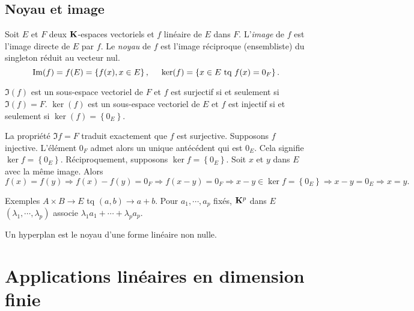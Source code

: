 \subsection{Noyau et image}
 
\begin{defi}
  Soit $E$ et $F$ deux $\K$-espaces vectoriels et $f$ linéaire de $E$ dans $F$. L'\emph{image} de $f$ est l'image directe de $E$ par $f$. Le \emph{noyau} de $f$ est l'image réciproque (ensembliste) du singleton réduit au vecteur nul.
\begin{displaymath}
  \Im(f) = f(E) = \left\lbrace f(x), x\in E\right\rbrace,\hspace{0.5cm}
  \ker(f) = \left\lbrace x \in E\text{ tq } f(x) = 0_F\right\rbrace  .
\end{displaymath}
\end{defi}
\begin{prop}
$\Im(f)$ est un sous-espace vectoriel de $F$ et $f$ est surjectif si et seulement si $\Im(f)=F$.\newline
$\ker(f)$ est un sous-espace vectoriel de $E$ et $f$ est injectif si et seulement si $\ker(f)=\left\lbrace 0_E\right\rbrace$.
\end{prop}
\begin{demo}
La propriété $\Im f = F$ traduit exactement que $f$ est surjective.\newline
Supposons $f$ injective. L'élément $0_F$ admet alors un unique antécédent qui est $0_E$. Cela signifie $\ker f = \left\lbrace 0_E \right\rbrace$. \newline
Réciproquement, supposons $\ker f = \left\lbrace 0_E \right\rbrace$. Soit $x$ et $y$ dans $E$ avec la même image. Alors
\[
 f(x) = f(y) \Rightarrow f(x) - f(y) = 0_F
 \Rightarrow f(x-y) = 0_F
 \Rightarrow x-y \in \ker f = \left\lbrace 0_E \right\rbrace
 \Rightarrow x - y = 0_E \Rightarrow x = y.
\]
\end{demo}

Exemples $A\times B \rightarrow E$ tq $(a,b)\rightarrow a+b$. Pour $a_1,\cdots,a_p$ fixés, $\K^p$ dans $E$ $(\lambda_1,\cdots,\lambda_p)$ associe $\lambda_1a_1+\cdots + \lambda_p a_p$.

\begin{defi}[hyperplan]
 Un hyperplan est le noyau d'une forme linéaire non nulle.
\end{defi}

\section{Applications linéaires en dimension finie} \label{sec:AppLinDimFin}
